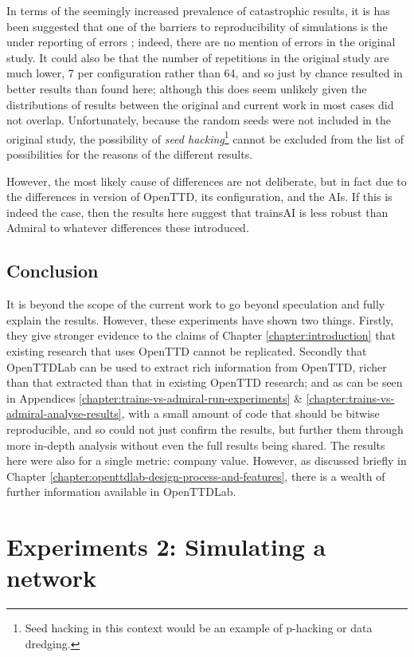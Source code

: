 \documentclass[logo,msc,dsti]{style/infthesis}    %
\newcommand{\singlespacedfootnote}[1]{{\singlespace\footnote{#1}}}
\begin{document}
{In terms of the seemingly increased prevalence of catastrophic results, it is has been suggested that one of the barriers to reproducibility of simulations is the under reporting of errors \cite{luijken2024replicability}; indeed, there are no mention of errors in the original study. It could also be that the number of repetitions in the original study are much lower, 7 per configuration rather than 64, and so just by chance resulted in better results than found here; although this does seem unlikely given the distributions of results between the original and current work in most cases did not overlap. Unfortunately, because the random seeds were not included in the original study, the possibility of \emph{seed hacking}\singlespacedfootnote{Seed hacking in this context would be an example of p-hacking or data dredging.} cannot be excluded from the list of possibilities for the reasons of the different results.

However, the most likely cause of differences are not deliberate, but in fact due to the differences in version of OpenTTD, its configuration, and the AIs. If this is indeed the case, then the results here suggest that trainsAI is less robust than Admiral to whatever differences these introduced.

\section{Conclusion}

It is beyond the scope of the current work to go beyond speculation and fully explain the results. However, these experiments have shown two things. Firstly, they give stronger evidence to the claims of Chapter \ref{chapter:introduction} that existing research that uses OpenTTD cannot be replicated. Secondly that OpenTTDLab can be used to extract rich information from OpenTTD, richer than that extracted than that in existing OpenTTD research; and as can be seen in Appendices \ref{chapter:trains-vs-admiral-run-experiments} \& \ref{chapter:trains-vs-admiral-analyse-results}, with a small amount of code that should be bitwise reproducible, and so could not just confirm the results, but further them through more in-depth analysis without even the full results being shared. The results here were also for a single metric: company value. However, as discussed briefly in Chapter \ref{chapter:openttdlab-design-process-and-features}, there is a wealth of further information available in OpenTTDLab.

\chapter{Experiments 2: Simulating a network}
\label{chapter:experiments-simple-parameterised-ai}

}
\end{document}

